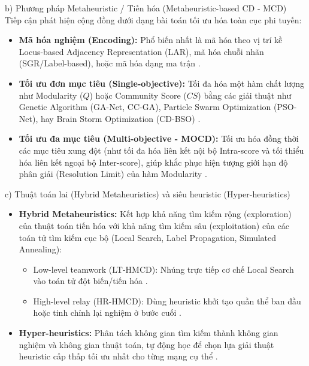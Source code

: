 \documentclass[14pt,a4paper]{extarticle}
\begin{document}
\noindent b) Phương pháp Metaheuristic / Tiến hóa (Metaheuristic-based CD - MCD) \\
Tiếp cận phát hiện cộng đồng dưới dạng bài toán tối ưu hóa toàn cục phi tuyến:
\begin{itemize}
    \item \textbf{Mã hóa nghiệm (Encoding):} Phổ biến nhất là mã hóa theo vị trí kề Locus-based Adjacency Representation (LAR), mã hóa chuỗi nhãn (SGR/Label-based), hoặc mã hóa dạng ma trận \cite{Baraa2021}.
    \item \textbf{Tối ưu đơn mục tiêu (Single-objective):} Tối đa hóa một hàm chất lượng như Modularity ($Q$) hoặc Community Score ($CS$) bằng các giải thuật như Genetic Algorithm (GA-Net, CC-GA), Particle Swarm Optimization (PSO-Net), hay Brain Storm Optimization (CD-BSO) \cite{Beldi2025}.
    \item \textbf{Tối ưu đa mục tiêu (Multi-objective - MOCD):} Tối ưu hóa đồng thời các mục tiêu xung đột (như tối đa hóa liên kết nội bộ Intra-score và tối thiểu hóa liên kết ngoại bộ Inter-score), giúp khắc phục hiện tượng giới hạn độ phân giải (Resolution Limit) của hàm Modularity \cite{Baraa2021}.
\end{itemize}

\noindent c) Thuật toán lai (Hybrid Metaheuristics) và siêu heuristic (Hyper-heuristics) \indent

\begin{itemize}
    \item \textbf{Hybrid Metaheuristics:} Kết hợp khả năng tìm kiếm rộng (exploration) của thuật toán tiến hóa với khả năng tìm kiếm sâu (exploitation) của các toán tử tìm kiếm cục bộ (Local Search, Label Propagation, Simulated Annealing):
    \begin{itemize}
        \item Low-level teamwork (LT-HMCD): Nhúng trực tiếp cơ chế Local Search vào toán tử đột biến/tiến hóa \cite{Baraa2021}.
        \item High-level relay (HR-HMCD): Dùng heuristic khởi tạo quần thể ban đầu hoặc tinh chỉnh lại nghiệm ở bước cuối \cite{Baraa2021}.
    \end{itemize}
    
    \item \textbf{Hyper-heuristics:} Phân tách không gian tìm kiếm thành không gian nghiệm và không gian thuật toán, tự động học để chọn lựa giải thuật heuristic cấp thấp tối ưu nhất cho từng mạng cụ thể \cite{Baraa2021}.
\end{itemize}
\end{document}
